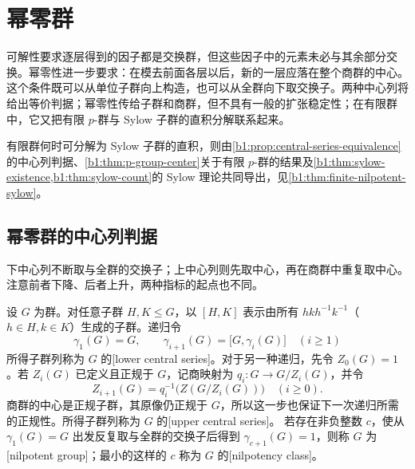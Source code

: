 
\section{幂零群}
\label{b1:sec:0703}

可解性要求逐层得到的因子都是交换群，但这些因子中的元素未必与其余部分交换。幂零性进一步要求：在模去前面各层以后，新的一层应落在整个商群的中心。这个条件既可以从单位子群向上构造，也可以从全群向下取交换子。两种中心列将给出等价判据；幂零性传给子群和商群，但不具有一般的扩张稳定性；在有限群中，它又把有限 \(p\)-群与 Sylow 子群的直积分解联系起来。

\ProseParagraphBreak
有限群何时可分解为 Sylow 子群的直积，则由\cref{b1:prop:central-series-equivalence}的中心列判据、\cref{b1:thm:p-group-center}关于有限 \(p\)-群的结果及\cref{b1:thm:sylow-existence,b1:thm:sylow-count}的 Sylow 理论共同导出，见\cref{b1:thm:finite-nilpotent-sylow}。

%
%

\subsection{幂零群的中心列判据}
\label{b1:subsec:0703:01}

下中心列不断取与全群的交换子；上中心列则先取中心，再在商群中重复取中心。注意前者下降、后者上升，两种指标的起点也不同。

\begin{definition}\label{b1:def:central-series}
	设 \(G\) 为群。对任意子群 \(H,K\leq G\)，以 \([H,K]\) 表示由所有 \(hkh^{-1}k^{-1}\)（\(h\in H,k\in K\)）生成的子群。递归令
	\[
		\gamma_1(G)=G,\qquad \gamma_{i+1}(G)=\bigl[G,\gamma_i(G)\bigr]\quad(i\ge1)
	\]
	所得子群列称为 \(G\) 的[lower central series]。对于另一种递归，先令 \(Z_0(G)=1\)。若 \(Z_i(G)\) 已定义且正规于 \(G\)，记商映射为 \(q_i:G\rightarrow G/Z_i(G)\)，并令
	\[
		Z_{i+1}(G)=q_i^{-1}\bigl(Z(G/Z_i(G))\bigr)\quad(i\ge0).
	\]
	商群的中心是正规子群，其原像仍正规于 \(G\)，所以这一步也保证下一次递归所需的正规性。所得子群列称为 \(G\) 的[upper central series]。 若存在非负整数 \(c\)，使从 \(\gamma_1(G)=G\) 出发反复取与全群的交换子后得到 \(\gamma_{c+1}(G)=1\)，则称 \(G\) 为[nilpotent group]；最小的这样的 \(c\) 称为 \(G\) 的[nilpotency class]。
\end{definition}

